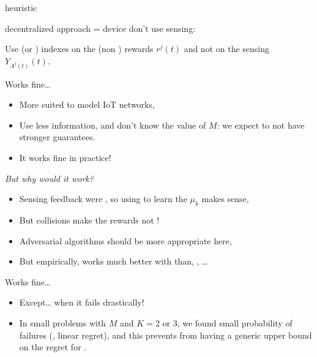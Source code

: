 \documentclass[12pt,english,ignorenonframetext,]{beamer}
\providecommand{\tightlist}{%
  \setlength{\itemsep}{0pt}\setlength{\parskip}{0pt}}
\begin{document}
\begin{frame}[allowframebreaks]{\Selfish{} heuristic}

\Selfish{} decentralized approach = device don't use sensing:

\begin{block}{\Selfish}
  Use \UCB{} (or \klUCB) indexes on the (non \iid) rewards \(r^j(t)\)
  and not on the sensing $Y_{A^j(t)}(t)$.
\end{block}

\begin{block}{Works fine\ldots{}}

\begin{itemize}\tightlist
\item
  More suited to model IoT networks,
\item
  Use less information, and don't know the value of \(M\): we expect
  \Selfish{} to not have stronger guarantees.
\item
  It works fine in practice!
\end{itemize}

\end{block}

\begin{block}{\emph{But why would it work?}}

\begin{itemize}\tightlist
\item
  Sensing feedback were \iid, so using \UCB{} to learn the \(\mu_k\) makes sense,
\item
  But collisions make the rewards not \iid{} !
\item
  Adversarial algorithms should be more appropriate here,
\item
  But empirically, \Selfish{} works much better with \klUCB{}
  than, \eg, \ExpThree\ldots{}
\end{itemize}

\end{block}

\begin{block}{Works fine\ldots{}}

\begin{itemize}\tightlist
\item
  Except\ldots{} when it fails drastically! \Sadey[1.3]
\item
  In small problems with \(M\) and \(K = 2\) or \(3\), we found small
  probability of failures (\ie, linear regret), and this prevents from
  having a generic upper bound on the regret for \Selfish.
\end{itemize}

\end{block}

\end{frame}
\end{document}
